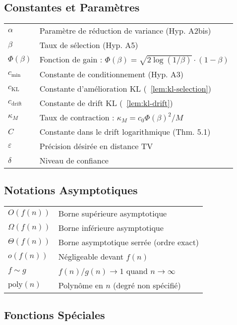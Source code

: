 \documentclass[12pt,a4paper]{article}
\theoremstyle{definition}
\theoremstyle{remark}
\newcommand{\KL}{\text{KL}}
\begin{document}
	\subsection*{Constantes et Paramètres}
	
	\begin{tabular}{ll}
		$\alpha$ & Paramètre de réduction de variance (Hyp. A2bis) \\
		$\beta$ & Taux de sélection (Hyp. A5) \\
		$\Phi(\beta)$ & Fonction de gain : $\Phi(\beta) = \sqrt{2\log(1/\beta)} \cdot (1-\beta)$ \\
		$c_{\min}$ & Constante de conditionnement (Hyp. A3) \\
		$c_{\KL}$ & Constante d'amélioration KL (~\ref{lem:kl-selection}) \\
		$c_{\text{drift}}$ & Constante de drift KL (~\ref{lem:kl-drift}) \\
		$\kappa_M$ & Taux de contraction : $\kappa_M = c_0 \Phi(\beta)^2 / M$ \\
		$C$ & Constante dans le drift logarithmique (Thm. 5.1) \\
		$\varepsilon$ & Précision désirée en distance TV \\
		$\delta$ & Niveau de confiance \\
	\end{tabular}
	
	\subsection*{Notations Asymptotiques}
	
	\begin{tabular}{ll}
		$O(f(n))$ & Borne supérieure asymptotique \\
		$\Omega(f(n))$ & Borne inférieure asymptotique \\
		$\Theta(f(n))$ & Borne asymptotique serrée (ordre exact) \\
		$o(f(n))$ & Négligeable devant $f(n)$ \\
		$f \sim g$ & $f(n)/g(n) \to 1$ quand $n \to \infty$ \\
		$\text{poly}(n)$ & Polynôme en $n$ (degré non spécifié) \\
	\end{tabular}
	
	\subsection*{Fonctions Spéciales}
	
\end{document}
